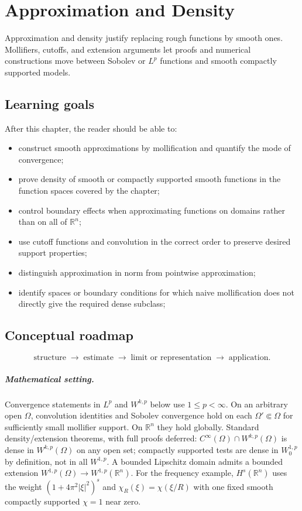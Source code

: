 \chapter{Approximation and Density}
\label{ch:iii22}

Approximation and density justify replacing rough functions by smooth ones. Mollifiers, cutoffs, and extension arguments let proofs and numerical constructions move between Sobolev or $L^p$ functions and smooth compactly supported models.

\section*{Learning goals}
After this chapter, the reader should be able to:
\begin{itemize}
\item construct smooth approximations by mollification and quantify the mode of convergence;
\item prove density of smooth or compactly supported smooth functions in the function spaces covered by the chapter;
\item control boundary effects when approximating functions on domains rather than on all of \(\mathbb R^n\);
\item use cutoff functions and convolution in the correct order to preserve desired support properties;
\item distinguish approximation in norm from pointwise approximation;
\item identify spaces or boundary conditions for which naive mollification does not directly give the required dense subclass;
\end{itemize}
\section*{Conceptual roadmap}
\[
\boxed{\text{structure}\;\longrightarrow\;\text{estimate}\;\longrightarrow\;\text{limit or representation}\;\longrightarrow\;\text{application}.}
\]

\paragraph{Mathematical setting.}
Convergence statements in $L^p$ and $W^{k,p}$ below use $1\le p<\infty$. On an arbitrary open $\Omega$, convolution identities and Sobolev convergence hold on each $\Omega'\Subset\Omega$ for sufficiently small mollifier support. On $\mathbb R^n$ they hold globally. Standard density/extension theorems, with full proofs deferred: $C^\infty(\Omega)\cap W^{k,p}(\Omega)$ is dense in $W^{k,p}(\Omega)$ on any open set; compactly supported tests are dense in $W_0^{1,p}$ by definition, not in all $W^{1,p}$. A bounded Lipschitz domain admits a bounded extension $W^{1,p}(\Omega)\to W^{1,p}(\mathbb R^n)$. For the frequency example, $H^s(\mathbb R^n)$ uses the weight $(1+4\pi^2|\xi|^2)^s$ and $\chi_R(\xi)=\chi(\xi/R)$ with one fixed smooth compactly supported $\chi=1$ near zero.


